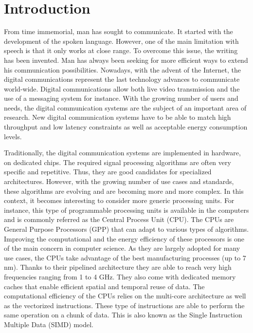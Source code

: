 
\graphicspath{{main/introduction/fig/}}

\chapter*{Introduction}

From time immemorial, man has sought to communicate. It started with the
development of the spoken language. However, one of the main limitation with
speech is that it only works at close range. To overcome this issue, the writing
has been invented. Man has always been seeking for more efficient ways to extend
his communication possibilities. Nowadays, with the advent of the Internet, the
digital communications represent the last technology advances to communicate
world-wide. Digital communications allow both live video transmission and the
use of a messaging system for instance. With the growing number of users and
needs, the digital communication systems are the subject of an important area of
research. New digital communication systems have to be able to match high
throughput and low latency constraints as well as acceptable energy consumption
levels.

Traditionally, the digital communication systems are implemented in hardware, on
dedicated chips. The required signal processing algorithms are often very
specific and repetitive. Thus, they are good candidates for specialized
architectures. However, with the growing number of use cases and standards,
these algorithms are evolving and are becoming more and more complex. In this
context, it becomes interesting to consider more generic processing units.
For instance, this type of programmable processing units is available in the
computers and is commonly referred as the Central Process Unit (CPU). The CPUs
are General Purpose Processors (GPP) that can adapt to various types of
algorithms. Improving the computational and the energy efficiency of these
processors is one of the main concern in computer science. As they are largely
adopted for many use cases, the CPUs take advantage of the best manufacturing
processes (up to 7 nm). Thanks to their pipelined architecture they are able to
reach very high frequencies ranging from 1 to 4 GHz. They also come with
dedicated memory caches that enable efficient spatial and temporal reuse of
data. The computational efficiency of the CPUs relies on the multi-core
architecture as well as the vectorized instructions. These type of instructions
are able to perform the same operation on a chunk of data. This is also known as
the Single Instruction Multiple Data (SIMD) model.


